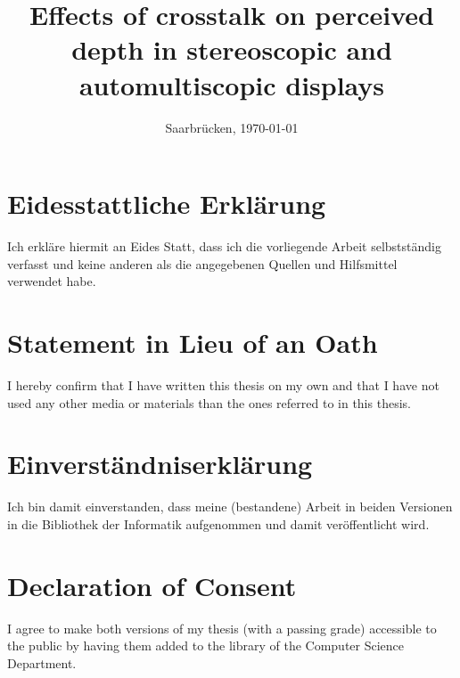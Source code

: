 \documentclass[11pt, a4paper, twoside]{Thesis}
\begin{document}

\frontmatter

\title  {Effects of crosstalk on perceived depth in stereoscopic and automultiscopic displays}

\addresses  {\groupname\\\deptname\\\univname}  %
\date       {Saarbr\"ucken, \today }
\subject    {}
\keywords   {}

\maketitle



\thispagestyle{empty}

\section*{Eidesstattliche Erkl\"{a}rung}
Ich erkl\"{a}re hiermit an Eides Statt, dass ich die vorliegende Arbeit selbstst\"{a}ndig verfasst und keine
anderen als die angegebenen Quellen und Hilfsmittel verwendet habe.

\vspace{0.60cm}
\section*{Statement in Lieu of an Oath}
I hereby confirm that I have written this thesis on my own and that I have not used any other media or
materials than the ones referred to in this thesis.
\vspace{1.5cm}

\section*{Einverst\"{a}ndniserkl\"{a}rung}
Ich bin damit einverstanden, dass meine (bestandene) Arbeit in beiden Versionen in die Bibliothek der
Informatik aufgenommen und damit ver\"{o}ffentlicht wird.

\vspace{0.60cm}
\section*{Declaration of Consent}
I agree to make both versions of my thesis (with a passing grade) accessible to the public by having
them added to the library of the Computer Science Department.
\vspace{3cm}
\end{document}
